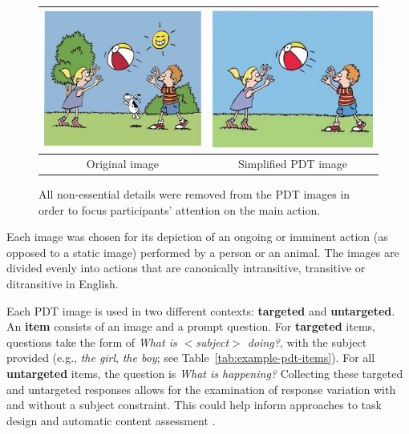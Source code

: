 \begin{figure}[htb!]
\begin{center}
\begin{tabular}{|c|c|}
\hline
{\includegraphics[width=0.38\columnwidth]{figures/throw-original.jpg}} & {\includegraphics[width=0.38\columnwidth]{figures/I21cropped.jpg}} \\
\hline
Original image & Simplified PDT image \\
\hline
\end{tabular}
\caption{\label{fig:image-prep} All non-essential details were removed from the PDT images in order to focus participants' attention on the main action.}
\end{center}
\end{figure}

Each image was chosen for its depiction of an ongoing or imminent action (as opposed to a static image) performed by a person or an animal. The images are divided evenly into actions that are canonically intransitive, transitive or ditransitive in English.

Each PDT image is used in two different contexts: \textbf{targeted} and \textbf{untargeted}. An \textbf{item} consists of an image and a prompt question. For \textbf{targeted} items, questions take the form of \textit{What is $<$subject$>$ doing?}, with the subject provided (e.g., \textit{the girl}, \textit{the boy}; see Table~\ref{tab:example-pdt-items}). For all \textbf{untargeted} items, the question is \textit{What is happening?}
Collecting these targeted and untargeted responses allows for the examination of response variation with and without a subject constraint. This could help inform approaches to task design and automatic content assessment \citep{foster2009native, cho2013investigating}. 

